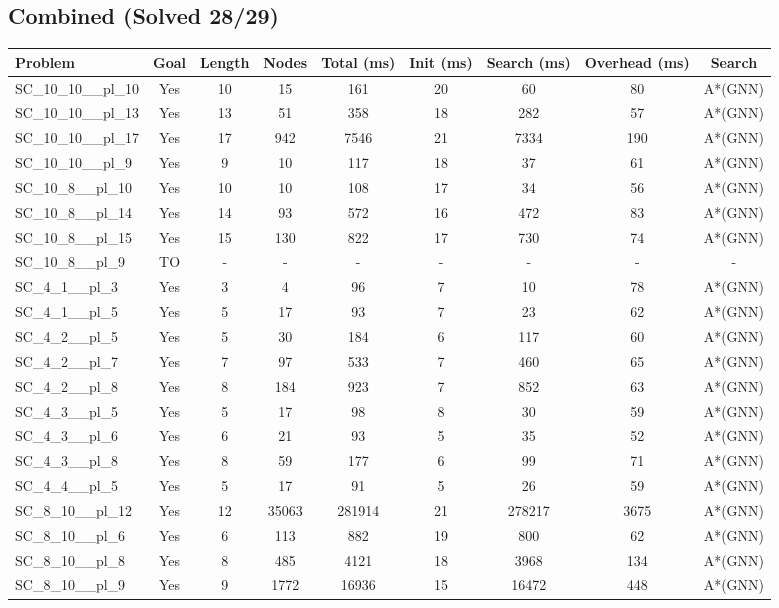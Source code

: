 \documentclass{article}
\begin{document}
\subsection*{Combined (Solved 28/29)}
\begin{tabular}{lcccccccc}
\toprule
Problem & Goal & Length & Nodes & Total (ms) & Init (ms) & Search (ms) & Overhead (ms) & Search \\
\midrule
SC\_10\_10\_\_pl\_10 & Yes & 10 & 15 & 161 & 20 & 60 & 80 & A*(GNN) \\
SC\_10\_10\_\_pl\_13 & Yes & 13 & 51 & 358 & 18 & 282 & 57 & A*(GNN) \\
SC\_10\_10\_\_pl\_17 & Yes & 17 & 942 & 7546 & 21 & 7334 & 190 & A*(GNN) \\
SC\_10\_10\_\_pl\_9 & Yes & 9 & 10 & 117 & 18 & 37 & 61 & A*(GNN) \\
SC\_10\_8\_\_pl\_10 & Yes & 10 & 10 & 108 & 17 & 34 & 56 & A*(GNN) \\
SC\_10\_8\_\_pl\_14 & Yes & 14 & 93 & 572 & 16 & 472 & 83 & A*(GNN) \\
SC\_10\_8\_\_pl\_15 & Yes & 15 & 130 & 822 & 17 & 730 & 74 & A*(GNN) \\
SC\_10\_8\_\_pl\_9 & TO & - & - & - & - & - & - & - \\
SC\_4\_1\_\_pl\_3 & Yes & 3 & 4 & 96 & 7 & 10 & 78 & A*(GNN) \\
SC\_4\_1\_\_pl\_5 & Yes & 5 & 17 & 93 & 7 & 23 & 62 & A*(GNN) \\
SC\_4\_2\_\_pl\_5 & Yes & 5 & 30 & 184 & 6 & 117 & 60 & A*(GNN) \\
SC\_4\_2\_\_pl\_7 & Yes & 7 & 97 & 533 & 7 & 460 & 65 & A*(GNN) \\
SC\_4\_2\_\_pl\_8 & Yes & 8 & 184 & 923 & 7 & 852 & 63 & A*(GNN) \\
SC\_4\_3\_\_pl\_5 & Yes & 5 & 17 & 98 & 8 & 30 & 59 & A*(GNN) \\
SC\_4\_3\_\_pl\_6 & Yes & 6 & 21 & 93 & 5 & 35 & 52 & A*(GNN) \\
SC\_4\_3\_\_pl\_8 & Yes & 8 & 59 & 177 & 6 & 99 & 71 & A*(GNN) \\
SC\_4\_4\_\_pl\_5 & Yes & 5 & 17 & 91 & 5 & 26 & 59 & A*(GNN) \\
SC\_8\_10\_\_pl\_12 & Yes & 12 & 35063 & 281914 & 21 & 278217 & 3675 & A*(GNN) \\
SC\_8\_10\_\_pl\_6 & Yes & 6 & 113 & 882 & 19 & 800 & 62 & A*(GNN) \\
SC\_8\_10\_\_pl\_8 & Yes & 8 & 485 & 4121 & 18 & 3968 & 134 & A*(GNN) \\
SC\_8\_10\_\_pl\_9 & Yes & 9 & 1772 & 16936 & 15 & 16472 & 448 & A*(GNN) \\

\end{tabular}
\end{document}
